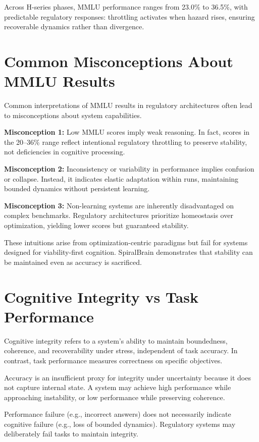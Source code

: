 \documentclass[12pt,a4paper]{report}
\begin{document}
Across H-series phases, MMLU performance ranges from 23.0\% to 36.5\%, with predictable regulatory responses: throttling activates when hazard rises, ensuring recoverable dynamics rather than divergence.

\section{Common Misconceptions About MMLU Results}

Common interpretations of MMLU results in regulatory architectures often lead to misconceptions about system capabilities.

\textbf{Misconception 1:} Low MMLU scores imply weak reasoning. In fact, scores in the 20–36\% range reflect intentional regulatory throttling to preserve stability, not deficiencies in cognitive processing.

\textbf{Misconception 2:} Inconsistency or variability in performance implies confusion or collapse. Instead, it indicates elastic adaptation within runs, maintaining bounded dynamics without persistent learning.

\textbf{Misconception 3:} Non-learning systems are inherently disadvantaged on complex benchmarks. Regulatory architectures prioritize homeostasis over optimization, yielding lower scores but guaranteed stability.

These intuitions arise from optimization-centric paradigms but fail for systems designed for viability-first cognition. SpiralBrain demonstrates that stability can be maintained even as accuracy is sacrificed.

\section{Cognitive Integrity vs Task Performance}

Cognitive integrity refers to a system's ability to maintain boundedness, coherence, and recoverability under stress, independent of task accuracy. In contrast, task performance measures correctness on specific objectives.

Accuracy is an insufficient proxy for integrity under uncertainty because it does not capture internal state. A system may achieve high performance while approaching instability, or low performance while preserving coherence.

Performance failure (e.g., incorrect answers) does not necessarily indicate cognitive failure (e.g., loss of bounded dynamics). Regulatory systems may deliberately fail tasks to maintain integrity.
\end{document}
